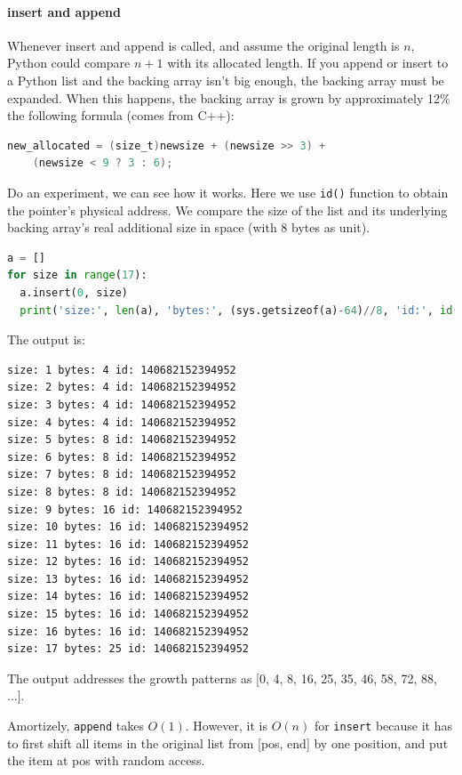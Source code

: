 \documentclass[../main.tex]{subfiles}
\begin{document}
\paragraph{insert and append} Whenever insert and append is called, and assume the original length is $n$, Python could compare $n+1$ with its allocated length. If you append or insert to a Python list and the backing array isn't big enough, the backing array must be expanded. When this happens, the backing array is grown by approximately 12\% the following formula (comes from C++):
\begin{lstlisting}[language=C]
new_allocated = (size_t)newsize + (newsize >> 3) +
    (newsize < 9 ? 3 : 6);
\end{lstlisting}
Do an experiment, we can see how it works. Here we use \texttt{id()} function to obtain the pointer's physical address. We compare the size of the list and its underlying backing array's real additional size in space (with 8 bytes as unit).
\begin{lstlisting}[language=Python]
a = []
for size in range(17):
  a.insert(0, size)
  print('size:', len(a), 'bytes:', (sys.getsizeof(a)-64)//8, 'id:', id(a))
\end{lstlisting}
The output is:
\begin{lstlisting}[numbers=none]
size: 1 bytes: 4 id: 140682152394952
size: 2 bytes: 4 id: 140682152394952
size: 3 bytes: 4 id: 140682152394952
size: 4 bytes: 4 id: 140682152394952
size: 5 bytes: 8 id: 140682152394952
size: 6 bytes: 8 id: 140682152394952
size: 7 bytes: 8 id: 140682152394952
size: 8 bytes: 8 id: 140682152394952
size: 9 bytes: 16 id: 140682152394952
size: 10 bytes: 16 id: 140682152394952
size: 11 bytes: 16 id: 140682152394952
size: 12 bytes: 16 id: 140682152394952
size: 13 bytes: 16 id: 140682152394952
size: 14 bytes: 16 id: 140682152394952
size: 15 bytes: 16 id: 140682152394952
size: 16 bytes: 16 id: 140682152394952
size: 17 bytes: 25 id: 140682152394952
\end{lstlisting}
The output addresses the growth patterns as [0, 4, 8, 16, 25, 35, 46, 58, 72, 88, ...]. 

Amortizely, \texttt{append} takes $O(1)$. However, it is $O(n)$ for \texttt{insert} because it has to first shift all items in the original list from [pos, end] by one position, and put the item at pos with random access. 
\end{document}
